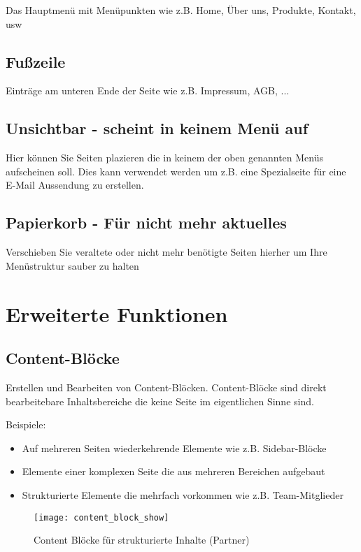 \documentclass[article, a4paper, oneside, 11pt]{memoir}
\begin{document}
Das Hauptmenü mit Menüpunkten wie z.B. Home, Über uns, Produkte, Kontakt, usw


\section{Fußzeile}

Einträge am unteren Ende der Seite wie z.B. Impressum, AGB, ...

\section{Unsichtbar - scheint in keinem Menü auf}

Hier können Sie Seiten plazieren die in keinem der oben genannten Menüs aufscheinen soll. Dies kann verwendet werden um z.B. eine Spezialseite für eine E-Mail Aussendung zu erstellen.

\section{Papierkorb - Für nicht mehr aktuelles}

Verschieben Sie veraltete oder nicht mehr benötigte Seiten hierher um Ihre Menüstruktur sauber zu halten

\chapter{Erweiterte Funktionen}

\section{Content-Blöcke}
\label{sec:contentblock}

Erstellen und Bearbeiten von Content-Blöcken. Content-Blöcke sind direkt bearbeitebare Inhaltsbereiche die keine Seite im eigentlichen Sinne sind.

Beispiele:

\begin{itemize}
\item Auf mehreren Seiten wiederkehrende Elemente wie z.B. Sidebar-Blöcke
\item Elemente einer komplexen Seite die aus mehreren Bereichen aufgebaut
\item Strukturierte Elemente die mehrfach vorkommen wie z.B. Team-Mitglieder
\end{itemize}

\begin{figure}[htp]
\centering
\texttt{[image: content\_block\_show]}
\caption{Content Blöcke für strukturierte Inhalte (Partner)}
\label{fig:content_block_show}
\end{figure}
\end{document}
